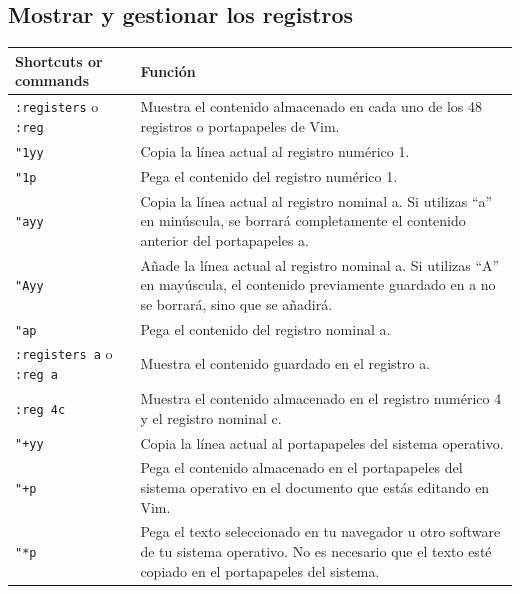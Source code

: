 \documentclass[
  doc,
  floatsintext,
  longtable,
  a4paper,
  nolmodern,
  notxfonts,
  notimes,
  12pt,
  colorlinks=true,linkcolor=blue,citecolor=blue,urlcolor=blue]{apa7}
\newcounter{none} %
\begin{document}
\subsection{Mostrar y gestionar los
registros}\label{mostrar-y-gestionar-los-registros}

{\def\LTcaptype{none} %
\begin{longtable}[]{@{}
  >{\raggedright\arraybackslash}p{}
  >{\raggedright\arraybackslash}p{}@{}}
\toprule\noalign{}
\begin{minipage}[b]{\linewidth}\raggedright
Shortcuts or commands
\end{minipage} & \begin{minipage}[b]{\linewidth}\raggedright
Función
\end{minipage} \\
\midrule\noalign{}
\endhead
\bottomrule\noalign{}
\endlastfoot
\texttt{:registers} o \texttt{:reg} & Muestra el contenido almacenado en
cada uno de los 48 registros o portapapeles de Vim. \\
\texttt{"1yy} & Copia la línea actual al registro numérico 1. \\
\texttt{"1p} & Pega el contenido del registro numérico 1. \\
\texttt{"ayy} & Copia la línea actual al registro nominal a. Si utilizas
``a'' en minúscula, se borrará completamente el contenido anterior del
portapapeles a. \\
\texttt{"Ayy} & Añade la línea actual al registro nominal a. Si utilizas
``A'' en mayúscula, el contenido previamente guardado en a no se
borrará, sino que se añadirá. \\
\texttt{"ap} & Pega el contenido del registro nominal a. \\
\texttt{:registers\ a} o \texttt{:reg\ a} & Muestra el contenido
guardado en el registro a. \\
\texttt{:reg\ 4c} & Muestra el contenido almacenado en el registro
numérico 4 y el registro nominal c. \\
\texttt{"+yy} & Copia la línea actual al portapapeles del sistema
operativo. \\
\texttt{"+p} & Pega el contenido almacenado en el portapapeles del
sistema operativo en el documento que estás editando en Vim. \\
\texttt{"*p} & Pega el texto seleccionado en tu navegador u otro
software de tu sistema operativo. No es necesario que el texto esté
copiado en el portapapeles del sistema. \\

\end{longtable}}
\end{document}
